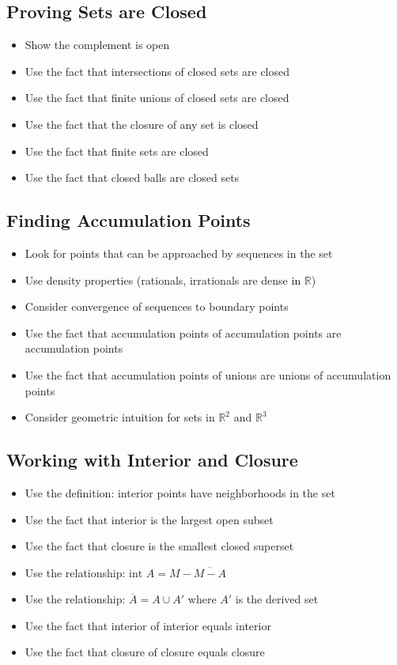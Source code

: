 \subsection*{Proving Sets are Closed}
\begin{itemize}
\item Show the complement is open
\item Use the fact that intersections of closed sets are closed
\item Use the fact that finite unions of closed sets are closed
\item Use the fact that the closure of any set is closed
\item Use the fact that finite sets are closed
\item Use the fact that closed balls are closed sets
\end{itemize}

\subsection*{Finding Accumulation Points}
\begin{itemize}
\item Look for points that can be approached by sequences in the set
\item Use density properties (rationals, irrationals are dense in $\mathbb{R}$)
\item Consider convergence of sequences to boundary points
\item Use the fact that accumulation points of accumulation points are accumulation points
\item Use the fact that accumulation points of unions are unions of accumulation points
\item Consider geometric intuition for sets in $\mathbb{R}^2$ and $\mathbb{R}^3$
\end{itemize}

\subsection*{Working with Interior and Closure}
\begin{itemize}
\item Use the definition: interior points have neighborhoods in the set
\item Use the fact that interior is the largest open subset
\item Use the fact that closure is the smallest closed superset
\item Use the relationship: $\text{int } A = M - \overline{M - A}$
\item Use the relationship: $\overline{A} = A \cup A'$ where $A'$ is the derived set
\item Use the fact that interior of interior equals interior
\item Use the fact that closure of closure equals closure
\end{itemize}

